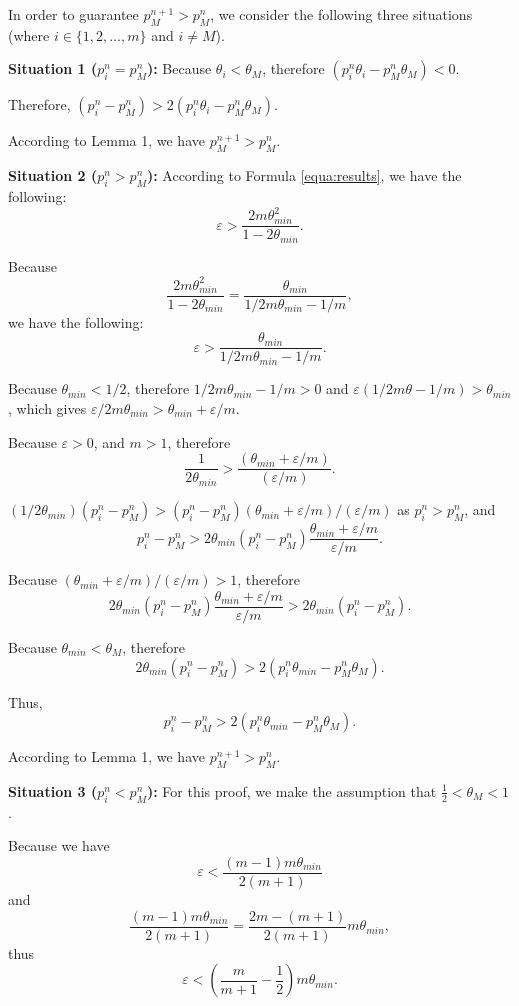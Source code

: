 \documentclass[10pt,journal,cspaper,compsoc,onecolumn]{IEEEtran}
\begin{document}
\begin{IEEEproof}
  In order to guarantee $p_M^{n + 1} > p_M^{n}$, we consider the following three situations (where $i \in \{1, 2, \ldots, m\}$ and $i \ne M$).

  \textbf{Situation 1 ($p_i^n = p_M^n$):}
Because $\theta_i < \theta_M$, therefore
$(p_i^n\theta_i - p_M^n\theta_M) < 0$.

Therefore, $(p_i^n - p_M^n) > 2(p_i^n\theta_i - p_M^n\theta_M)$.

According to Lemma 1, we have $p_M^{n + 1} > p_M^{n}$.

\textbf{Situation 2 ($p_i^n > p_M^n$):} According to Formula \ref{equa:results}, we have the following:
$$\varepsilon > \displaystyle\frac{2m\theta_{min}^2}{1-2\theta_{min}}.$$

Because
$$\displaystyle\frac{2m\theta_{min}^2}{1-2\theta_{min}} = \displaystyle\frac{\theta_{min}}{1/2m\theta_{min} - 1/m},$$
we have the following:
$$\varepsilon > \displaystyle\frac{\theta_{min}}{1/2m\theta_{min} - 1/m}.$$

Because $\theta_{min} < 1/2$, therefore
$1/2m\theta_{min} - 1/m > 0$ and
$\varepsilon(1/2m\theta - 1/m) > \theta_{min}$, which gives
$\varepsilon/2m\theta_{min} > \theta_{min} + \varepsilon/m$.

Because $\varepsilon > 0$, and $m > 1$, therefore
 $$\displaystyle\frac{1}{2\theta_{min}} > \displaystyle\frac{(\theta_{min} + \varepsilon/m)}{(\varepsilon/m)}.$$

$(1/2\theta_{min})(p_i^n - p_M^n) > (p_i^n - p_M^n)(\theta_{min} + \varepsilon/m)/(\varepsilon/m)$ as
$p_i^n > p_M^n$, and
$$p_i^n -p_M^n > 2\theta_{min}(p_i^n -p_M^n)\displaystyle\frac{\theta_{min} + \varepsilon/m}{\varepsilon/m}.$$

Because $(\theta_{min} + \varepsilon/m)/(\varepsilon/m) > 1$, therefore
$$2\theta_{min}(p_i^n -p_M^n)\displaystyle\frac{\theta_{min} + \varepsilon/m}{\varepsilon/m} > 2\theta_{min}(p_i^n -p_M^n).$$

Because $\theta_{min} < \theta_M$, therefore
$$2\theta_{min}(p_i^n - p_M^n) > 2(p_i^n\theta_{min} - p_M^n\theta_M).$$

Thus,
$$p_i^n -p_M^n > 2(p_i^n\theta_{min} - p_M^n\theta_M).$$

According to Lemma 1, we have $p_M^{n + 1} > p_M^{n}$.

\textbf{Situation 3 ($p_i^n < p_M^n$):}
For this proof, we make the assumption that $\frac{1}{2} < \theta_M < 1$.

Because we have
$$\varepsilon < \displaystyle\frac{(m - 1)m\theta_{min}}{2(m + 1)}$$
and
$$\displaystyle\frac{(m - 1)m\theta_{min}}{2(m + 1)} = \displaystyle\frac{2m -(m + 1)}{2(m + 1)}m\theta_{min},$$
thus
$$\varepsilon < (\displaystyle\frac{m}{m +1} - \displaystyle\frac{1}{2})m\theta_{min}.$$


\end{IEEEproof}
\end{document}
